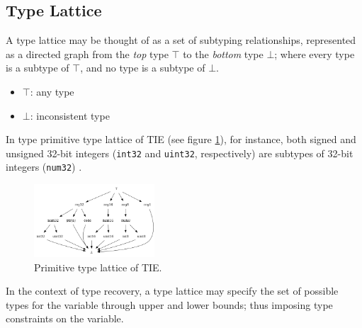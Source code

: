 
\subsection{Type Lattice}

A type lattice may be thought of as a set of subtyping relationships, represented as a directed graph from the \textit{top} type $\top$ to the \textit{bottom} type $\bot$; where every type is a subtype of $\top$, and no type is a subtype of $\bot$.

\begin{itemize}
	\item $\top$: any type
	\item $\bot$: inconsistent type
\end{itemize}

In type primitive type lattice of TIE (see figure \ref{fig:primitive_type_lattice}), for instance, both signed and unsigned 32-bit integers (\texttt{int32} and \texttt{uint32}, respectively) are subtypes of 32-bit integers (\texttt{num32}) \cite{tie_reverse_engineering_of_types}.

\begin{figure}[htbp]
	\centering
	\includegraphics[width=0.40\textwidth]{inc/tie_primitive_type_lattice.png}
	\caption{Primitive type lattice of TIE.}
	\label{fig:primitive_type_lattice}
\end{figure}

In the context of type recovery, a type lattice may specify the set of possible types for the variable through upper and lower bounds; thus imposing type constraints on the variable.
